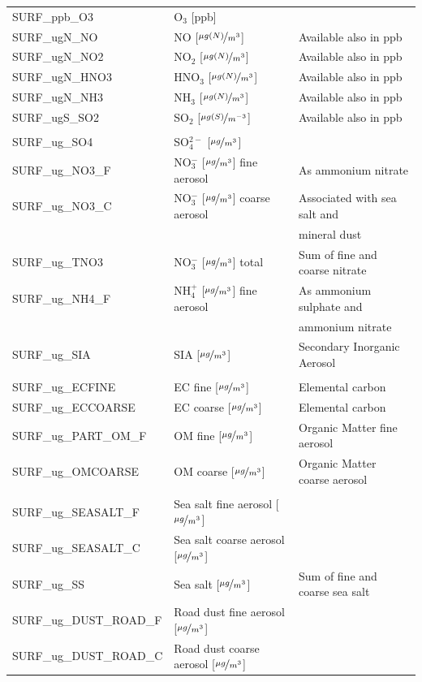 \documentclass[a4paper,12pt]{report}
\newcommand{\tug}{$\nicefrac{\mu g}{m^{3}}$}
\newcommand{\tugN}{$\nicefrac{\mu g(N)}{ m^{3}}$}
\newcommand{\tugS}{$\nicefrac{\mu g(S)}{m^{-3}}$}
\begin{document}
\begin{center}
\begin{longtable}{lll}
    SURF\_ppb\_O3 & O$_{3}$ [ppb]&  \\
    SURF\_ugN\_NO & NO [\tugN]& Available also in ppb \\
    SURF\_ugN\_NO2 & NO$_{2}$ [\tugN]& Available also in ppb \\
    SURF\_ugN\_HNO3 & HNO$_{3}$ [\tugN]&  Available also in ppb \\
    SURF\_ugN\_NH3 & NH$_{3}$ [\tugN]& Available also in ppb \\
    SURF\_ugS\_SO2 & SO$_{2}$ [\tugS]& Available also in ppb \\
    & & \\
    SURF\_ug\_SO4 & SO$_{4}^{2-}$ [\tug]&  \\
    SURF\_ug\_NO3\_F & NO$_{3}^{-}$ [\tug] fine aerosol & As ammonium nitrate \\
    SURF\_ug\_NO3\_C & NO$_{3}^{-}$ [\tug] coarse aerosol& Associated
    with sea salt and \\ & & mineral dust \\
    SURF\_ug\_TNO3 & NO$_{3}^{-}$ [\tug] total & Sum of fine and coarse nitrate \\
    SURF\_ug\_NH4\_F & NH$_{4}^{+}$ [\tug] fine aerosol& As ammonium
    sulphate and \\ & &  ammonium nitrate \\
    SURF\_ug\_SIA & SIA [\tug]& Secondary Inorganic Aerosol \\
    & & \\
    SURF\_ug\_ECFINE & EC fine [\tug]& Elemental carbon \\
    SURF\_ug\_ECCOARSE & EC coarse [\tug]& Elemental carbon \\
    SURF\_ug\_PART\_OM\_F & OM fine [\tug]& Organic Matter fine aerosol\\
    SURF\_ug\_OMCOARSE & OM coarse [\tug]& Organic Matter coarse
    aerosol\\
    & & \\
    SURF\_ug\_SEASALT\_F & Sea salt fine aerosol [\tug]&  \\
    SURF\_ug\_SEASALT\_C & Sea salt coarse aerosol [\tug]&  \\
    SURF\_ug\_SS & Sea salt  [\tug]& Sum of fine and coarse sea salt \\
    SURF\_ug\_DUST\_ROAD\_F & Road dust fine aerosol [\tug]&  \\
    SURF\_ug\_DUST\_ROAD\_C & Road dust coarse aerosol [\tug]&  \\

\end{longtable}
\end{center}
\end{document}
